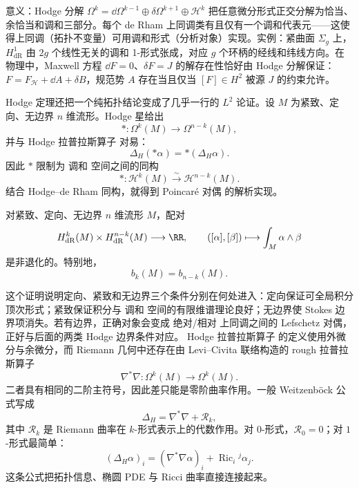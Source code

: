 意义：Hodge 分解 $\Omega^k=\dd\Omega^{k-1}\oplus\delta\Omega^{k+1}\oplus\mathcal H^k$ 把任意微分形式正交分解为恰当、余恰当和调和三部分。每个 de Rham 上同调类有且仅有一个调和代表元——这使得上同调（拓扑不变量）可用调和形式（分析对象）实现。实例：紧曲面 $\Sigma_g$ 上，$H^1_{\mathrm{dR}}$ 由 $2g$ 个线性无关的调和 1-形式张成，对应 $g$ 个环柄的经线和纬线方向。在物理中，Maxwell 方程 $\dd F=0$、$\delta F=J$ 的解存在性恰好由 Hodge 分解保证：$F=F_{\mathcal H}+\dd A+\delta B$，规范势 $A$ 存在当且仅当 $[F]\in H^2$ 被源 $J$ 的约束允许。

Hodge 定理还把一个纯拓扑结论变成了几乎一行的 $L^2$ 论证。设 $M$ 为紧致、定向、无边界 $n$ 维流形。Hodge 星给出
\[
*:\Omega^k(M)\longrightarrow\Omega^{n-k}(M),
\]
并与 Hodge 拉普拉斯算子 对易：
\[
\Delta_H(*\alpha)=*(\Delta_H\alpha).
\]
因此 $*$ 限制为 调和 空间之间的同构
\begin{equation}
*:\mathcal H^k(M)\overset{\sim}{\longrightarrow}\mathcal H^{n-k}(M).
\label{eq:math-dg-hodge-star-harmonic-isomorphism}
\end{equation}
结合 Hodge--de Rham 同构，就得到 Poincaré 对偶 的解析实现。

\begin{theorem}\label{thm:math-dg-poincare-duality-hodge}
对紧致、定向、无边界 $n$ 维流形 $M$，配对
\begin{equation}
H^k_{\mathrm{dR}}(M)\times H^{n-k}_{\mathrm{dR}}(M)
\longrightarrow\RR,
\qquad
([\alpha],[\beta])\longmapsto\int_M\alpha\wedge\beta
\label{eq:math-dg-poincare-pairing}
\end{equation}
是非退化的。特别地，
\[
b_k(M)=b_{n-k}(M).
\]
\end{theorem}

这个证明说明定向、紧致和无边界三个条件分别在何处进入：定向保证可全局积分顶次形式；紧致保证积分与 调和 空间的有限维谱理论良好；无边界使 Stokes 边界项消失。若有边界，正确对象会变成 绝对/相对 上同调之间的 Lefschetz 对偶，正好与后面的两类 Hodge 边界条件对应。
Hodge 拉普拉斯算子 的定义使用外微分与余微分，而 Riemann 几何中还存在由 Levi--Civita 联络构造的 rough 拉普拉斯算子
\[
\nabla^*\nabla:
\Omega^k(M)\to\Omega^k(M).
\]
二者具有相同的二阶主符号，因此差只能是零阶曲率作用。一般 Weitzenböck 公式写成
\begin{equation*}{
\Delta_H
=\nabla^*\nabla+\mathcal R_k
},\end{equation*}
其中 $\mathcal R_k$ 是 Riemann 曲率在 $k$-形式表示上的代数作用。对 $0$-形式，$\mathcal R_0=0$；对 $1$-形式最简单：
\begin{equation}
{
(\Delta_H\alpha)_i
=(\nabla^*\nabla\alpha)_i
+\operatorname{Ric}_i{}^j\alpha_j
}.
\label{eq:math-dg-weitzenbock-oneform}
\end{equation}
这条公式把拓扑信息、椭圆 PDE 与 Ricci 曲率直接连接起来。

